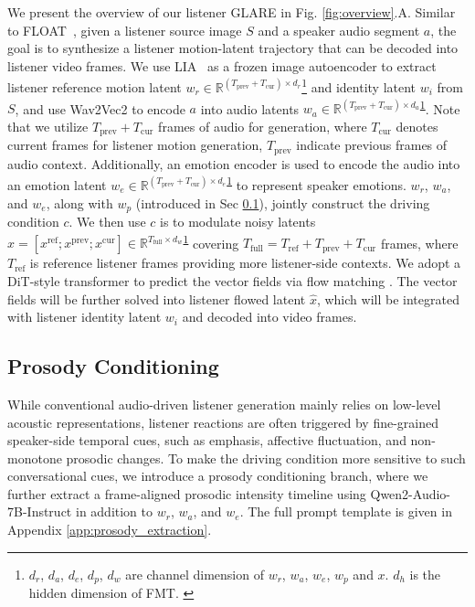 We present the overview of our listener GLARE in Fig. \ref{fig:overview}.A. Similar to FLOAT~\cite{ki2025float}, given a listener source image $S$ and a speaker audio segment $a$, the goal is to synthesize a listener motion-latent trajectory that can be decoded into listener video frames. We use LIA~\cite{wang2022lia} as a frozen image autoencoder to extract listener reference motion latent $w_r\in\mathbb{R}^{(T_{\text{prev}}+T_{\text{cur}})\times d_r}$\footnote{$d_r$, $d_a$, $d_e$, $d_{p}$, $d_w$ are channel dimension of $w_r$, $w_a$, $w_e$, $w_{p}$ and $x$. $d_h$ is the hidden dimension of FMT. \label{footnote1}} 
and identity latent $w_i$ from $S$, and use Wav2Vec2 \cite{baevski2020wav2vec} to encode $a$ into audio latents $w_a\in\mathbb{R}^{(T_{\text{prev}}+T_{\text{cur}})\times d_a}$\textsuperscript{\ref{footnote1}}. Note that we utilize $T_{\text{prev}}+T_{\text{cur}}$ frames of audio for generation, where $T_{\text{cur}}$ denotes current frames for listener motion generation, $T_{\text{prev}}$ indicate previous frames of audio context. Additionally, an emotion encoder \cite{pepino2021emotion} is used to encode the audio into an emotion latent $w_e\in\mathbb{R}^{(T_{\text{prev}}+T_{\text{cur}})\times d_e}$\textsuperscript{\ref{footnote1}} to represent speaker emotions. $w_r$, $w_a$, and $w_e$, along with $w_{p}$ (introduced in Sec \ref{sec:prosody_cond}), jointly construct the driving condition $c$. We then use $c$ is to modulate noisy latents $x=[x^{\text{ref}};x^{\text{prev}};x^{\text{cur}}]\in\mathbb{R}^{T_{\text{full}}\times d_w}$\textsuperscript{\ref{footnote1}} covering $T_{\text{full}}=T_{\text{ref}}+T_{\text{prev}}+T_{\text{cur}}$ frames, where $T_{\text{ref}}$ is reference listener frames providing more listener-side contexts. We adopt a DiT-style transformer \cite{peebles2023scalablediff} to predict the vector fields via flow matching \cite{lipman2022flow,ki2025float}. The vector fields will be further solved into listener flowed latent $\hat{x}$, which will be integrated with listener identity latent $w_i$ and decoded into video frames.

\vspace{-0.5em}
\subsection{Prosody Conditioning}  \label{sec:prosody_cond}
\vspace{-0.5em}

While conventional audio-driven listener generation mainly relies on low-level acoustic representations, listener reactions are often triggered by fine-grained speaker-side temporal cues, such as emphasis, affective fluctuation, and non-monotone prosodic changes. To make the driving condition more sensitive to such conversational cues, we introduce a prosody conditioning branch, where we further extract a frame-aligned prosodic intensity timeline using Qwen2-Audio-7B-Instruct \cite{Qwen2-Audio} in addition to $w_r$, $w_a$, and $w_e$. The full prompt template is given in Appendix \ref{app:prosody_extraction}.

